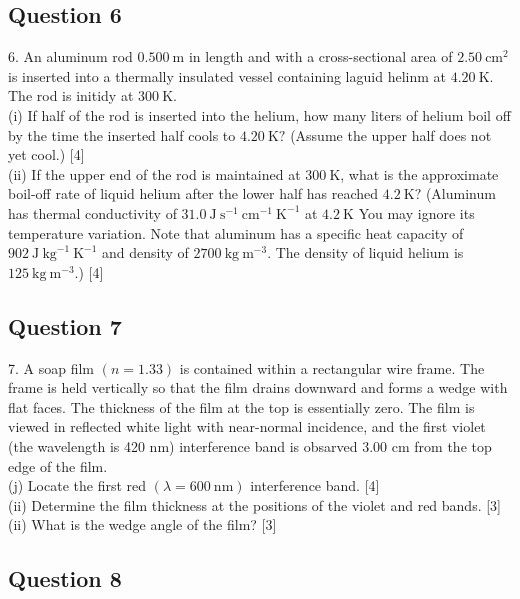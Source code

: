 \subsection{Question 6}
6. An aluminum rod $0.500 \mathrm{~m}$ in length and with a cross-sectional area of $2.50 \mathrm{~cm}^{2}$ is inserted into a thermally insulated vessel containing laguid helinm at $4.20 \mathrm{~K}$. The rod is initidy at $300 \mathrm{~K}$. \\
(i) If half of the rod is inserted into the helium, how many liters of helium boil off by the time the inserted half cools to $4.20 \mathrm{~K} ?$ (Assume the upper half does not yet cool.) [4] \\
(ii) If the upper end of the rod is maintained at $300 \mathrm{~K}$, what is the approximate boil-off rate of liquid helium after the lower half has reached $4.2 \mathrm{~K} ?$ (Aluminum has thermal conductivity of $31.0 \mathrm{~J} \mathrm{~s}^{-1} \mathrm{~cm}^{-1} \mathrm{~K}^{-1}$ at $4.2 \mathrm{~K}$ You may ignore its temperature variation. Note that aluminum has a specific heat capacity of $902 \mathrm{~J~kg}^{-1} \mathrm{~K}^{-1}$ and density of $2700 \mathrm{~kg} \mathrm{~m}^{-3}$. The density of liquid helium is $125 \mathrm{~kg} \mathrm{~m}^{-3}$.) [4] \\



\subsection{Question 7}

7. A soap film $(n=1.33)$ is contained within a rectangular wire frame. The frame is held vertically so that the film drains downward and forms a wedge with flat faces. The thickness of the film at the top is essentially zero. The film is viewed in reflected white light with near-normal incidence, and the first violet (the wavelength is 420 nm) interference band is obsarved $3.00$ cm from the top edge of the film. \\
(j) Locate the first red $(\lambda=600 \mathrm{~nm})$ interference band. [4] \\
(ii) Determine the film thickness at the positions of the violet and red bands. [3] \\
(ii) What is the wedge angle of the film? [3] \\

\subsection{Question 8}

